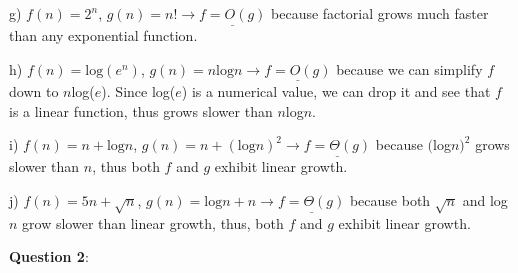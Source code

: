 \documentclass{article} %
\newcommand{\question}[2][]{\begin{flushleft}
        \textbf{Question #1}: \textit{#2}

\end{flushleft}}
\begin{document}
    \vspace{5pt}

    g) $f(n) = 2^n$, $g(n) = n! \rightarrow \underline{f = O(g)}$
    because factorial grows much faster than any exponential 
    \tabto{28pt} function.

    \vspace{5pt}

    h) $f(n) = \text{log}(e^n)$, $g(n) = n \text{log}n \rightarrow \underline{f = O(g)}$ 
    because we can simplify $f$ down to $n$log($e$). Since
    \tabto{28pt} log($e$) is a numerical value, we can drop it and see that $f$ is a linear function, thus grows
    \tabto{28pt} slower than $n$log$n$.

    \vspace{5pt}

    i) $f(n) = n + \text{log}n$, $g(n) = n + (\text{log}n)^2 \rightarrow \underline{f = \Theta(g)}$
    because $($log$n)^2$ grows slower than $n$, thus 
    \tabto{28pt} both $f$ and $g$ exhibit linear growth.

    \vspace{5pt}

    j) $f(n) = 5n + \sqrt{n}$, $g(n) = \text{log}n + n \rightarrow \underline{f = \Theta(g)}$
    because both $\sqrt{n}$ and log$n$ grow slower than 
    \tabto{28pt} linear growth, thus, both $f$ and $g$ exhibit linear growth.


    \question[2]{}
\end{document}
